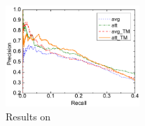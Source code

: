 \begin{figure}[t!]
\includegraphics[width=0.45\textwidth]{figures/re_att_avg_cmp_exp.pdf}
\caption{Results on \EntityRE}
\label{fig: Riedel_res}
\end{figure}




